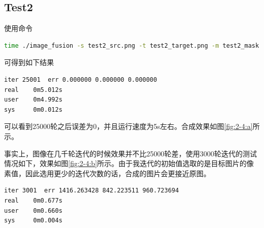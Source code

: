 \documentclass[a4paper]{article}
\begin{document}
\subsection{Test2}
使用命令
\begin{lstlisting}[language=bash]
time ./image_fusion -s test2_src.png -t test2_target.png -m test2_mask.png -o test2_result.png -i 25000 -h 150 -w 150
\end{lstlisting}
可得到如下结果
\begin{lstlisting}[language=bash]
iter 25001  err 0.000000 0.000000 0.000000
real    0m5.012s
user    0m4.992s
sys     0m0.012s
\end{lstlisting}

可以看到25000轮之后误差为0，并且运行速度为5s左右。合成效果如图\ref{fig:2-4:a}所示。

事实上，图像在几千轮迭代的时候效果并不比25000轮差，使用3000轮迭代的测试情况如下，效果如图\ref{fig:2-4:b}所示。由于我迭代的初始值选取的是目标图片的像素值，因此选用更少的迭代次数的话，合成的图片会更接近原图。

\begin{lstlisting}[language=bash]
iter 3001  err 1416.263428 842.223511 960.723694
real    0m0.677s
user    0m0.660s
sys     0m0.004s
\end{lstlisting}
\end{document}
